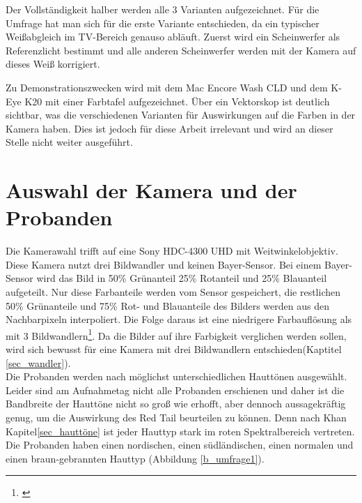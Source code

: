Der Vollständigkeit halber werden alle 3 Varianten aufgezeichnet. Für die Umfrage hat man sich für die erste Variante entschieden, da ein typischer Weißabgleich im TV-Bereich genauso abläuft. Zuerst wird ein Scheinwerfer als Referenzlicht bestimmt und alle anderen Scheinwerfer werden mit der Kamera auf dieses Weiß korrigiert. 

Zu Demonstrationszwecken wird mit dem Mac Encore Wash CLD und dem K-Eye K20 mit einer Farbtafel aufgezeichnet. Über ein Vektorskop ist deutlich sichtbar, was die verschiedenen Varianten für Auswirkungen auf die Farben in der Kamera haben. Dies ist jedoch für diese Arbeit irrelevant und wird an dieser Stelle nicht weiter ausgeführt. %

\section{Auswahl der Kamera und der Probanden}
\label{sec_wahlderKamera}

Die Kamerawahl trifft auf eine Sony HDC-4300 UHD mit Weitwinkelobjektiv. Diese Kamera nutzt drei Bildwandler und keinen Bayer-Sensor. Bei einem Bayer-Sensor wird das Bild in 50\% Grünanteil 25\% Rotanteil und 25\% Blauanteil aufgeteilt. Nur diese Farbanteile werden vom Sensor gespeichert, die restlichen 50\% Grünanteile und 75\% Rot- und Blauanteile des Bilders werden aus den Nachbarpixeln interpoliert. Die Folge daraus ist eine niedrigere Farbauflösung als mit 3 Bildwandlern\footnote{\cite[380-381]{schmidt}}. Da die Bilder auf ihre Farbigkeit verglichen werden sollen, wird sich bewusst für eine Kamera mit drei Bildwandlern entschieden(Kaptitel \ref{sec_wandler}).\\

Die Probanden werden nach möglichst unterschiedlichen Hauttönen ausgewählt. Leider sind am Aufnahmetag nicht alle Probanden erschienen und daher ist die Bandbreite der Hauttöne nicht so groß wie erhofft, aber dennoch aussagekräftig genug, um die Auswirkung des Red Tail beurteilen zu können. Denn nach Khan Kapitel\ref{sec_hauttöne} ist jeder Hauttyp stark im roten Spektralbereich vertreten. Die Probanden haben einen nordischen, einen südländischen, einen normalen und einen braun-gebrannten Hauttyp (Abbildung \ref{b_umfrage1}). 


